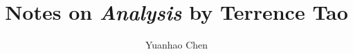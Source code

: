 \documentclass[12pt]{article}
\numberwithin{axiom}{section}
\numberwithin{definition}{section}
\begin{document}
\title{Notes on \textit{Analysis} by Terrence Tao}
\author{Yuanhao Chen}
\clearpage\maketitle
\thispagestyle{empty}

\renewcommand\thesection{\Alph{section}}

\renewcommand\thesection{\arabic{section}}
\setcounter{section}{1}


\end{document}

